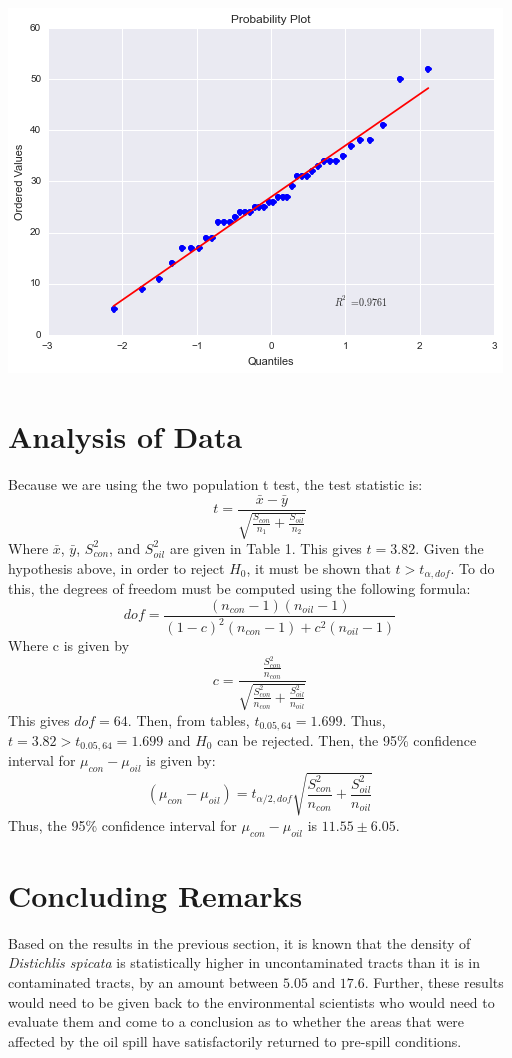 \documentclass[twoside]{article}
\newcommand{\mean}[1]{\bar{#1}}
\begin{document}
\begin{multicols}{2}
\includegraphics[scale=0.35]{output_6_0}


\section{Analysis of Data}

Because we are using the two population t test, the test statistic is: $$t = \frac{\mean{x}-\mean{y}}{\sqrt{\frac{S_{con}}{n_{1}}+\frac{S_{oil}}{n_{2}}}}$$ Where $\mean{x}$, $\mean{y}$, $S_{con}^2$, and $S_{oil}^2$ are given in Table 1.  This gives $t = 3.82$.  Given the hypothesis above, in order to reject $H_0$, it must be shown that $t>t_{\alpha, dof}$.  To do this, the degrees of freedom must be computed using the following formula: $$dof = \frac{(n_{con}-1)(n_{oil}-1)}{(1-c)^2(n_{con}-1)+c^2(n_{oil}-1)}$$ Where c is given by $$c = \frac{\frac{S_{con}^2}{n_{con}}}{\sqrt{\frac{S_{con}^2}{n_{con}} + \frac{S_{oil}^2}{n_{oil}}}}$$  This gives $dof = 64$.  Then, from tables, $t_{0.05, 64} = 1.699$.  Thus, $t = 3.82 > t_{0.05, 64} = 1.699$ and $H_0$ can be rejected.  Then, the 95\% confidence interval for $\mu_{con} - \mu_{oil}$ is given by: $$(\mu_{con} - \mu_{oil}) = t_{\alpha/2, dof}\sqrt{\frac{S_{con}^2}{n_{con}} + \frac{S_{oil}^2}{n_{oil}}}$$  Thus, the 95\% confidence interval for $\mu_{con} - \mu_{oil}$ is $11.55 \pm 6.05$.


\section{Concluding Remarks}
Based on the results in the previous section, it is known that the density of \textit{Distichlis spicata} is statistically higher in uncontaminated tracts than it is in contaminated tracts, by an amount between $5.05$ and $17.6$.  Further, these results would need to be given back to the environmental scientists who would need to evaluate them and come to a conclusion as to whether the areas that were affected by the oil spill have satisfactorily returned to pre-spill conditions.


\end{multicols}
\end{document}
